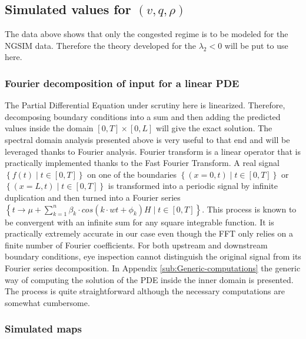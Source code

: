 \documentclass[preprint]{elsarticle}
\begin{document}
\subsection{Simulated values for $\left(v,q,\rho\right)$}

The data above shows that only the congested regime is to be modeled
for the NGSIM data. Therefore the theory developed for the $\lambda_{2}<0$
will be put to use here.


\subsubsection{Fourier decomposition of input for a linear PDE}

The Partial Differential Equation under scrutiny here is linearized.
Therefore, decomposing boundary conditions into a sum and then adding
the predicted values inside the domain $\left[0,T\right]\times\left[0,L\right]$
will give the exact solution. The spectral domain analysis presented
above is very useful to that end and will be leveraged thanks to Fourier
analysis. Fourier transform is a linear operator that is practically
implemented thanks to the Fast Fourier Transform. A real signal $\left\{ f\left(t\right)\mid t\in\left[0,T\right]\right\} $
on one of the boundaries $\left\{ \left(x=0,t\right)\mid t\in\left[0,T\right]\right\} $
or $\left\{ \left(x=L,t\right)\mid t\in\left[0,T\right]\right\} $
is transformed into a periodic signal by infinite duplication and
then turned into a Fourier series $\left\{ t\rightarrow\mu+\sum_{k=1}^{n}\beta_{k}\cdot cos\left(k\cdot wt+\phi_{k}\right)H\mid t\in\left[0,T\right]\right\} $.
This process is known to be convergent with an infinite sum for any
square integrable function. It is practically extremely accurate in
our case even though the FFT only relies on a finite number of Fourier
coefficients. For both upstream and downstream boundary conditions,
eye inspection cannot distinguish the original signal from its Fourier
series decomposition. In Appendix \ref{sub:Generic-computations}
the generic way of computing the solution of the PDE inside the inner
domain is presented. The process is quite straightforward although
the necessary computations are somewhat cumbersome.


\subsubsection{Simulated maps}
\end{document}
